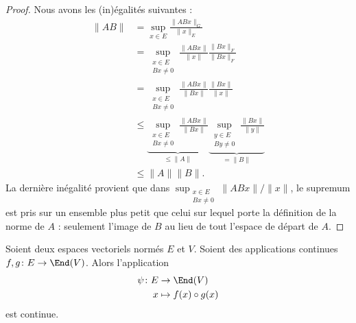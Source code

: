 \begin{proof}

    Nous avons les (in)égalités suivantes :
    \begin{subequations}
        \begin{align}
            \| AB \|&=\sup_{x\in E}\frac{ \| ABx \|_G }{ \| x \|_E }\\
            &=\sup_{\substack{x\in E\\Bx\neq 0}}\frac{ \| ABx \| }{ \| x \| }\frac{ \| Bx \|_F }{ \| Bx \|_F }\\
            &=\sup_{\substack{x\in E\\Bx\neq 0}}\frac{ \| ABx \| }{ \| Bx \| }\frac{ \| Bx \| }{ \| x \| }\\
            &\leq\underbrace{\sup_{\substack{x\in E\\Bx\neq 0}}\frac{ \| ABx \| }{ \| Bx \| }}_{\leq\| A \|}\underbrace{\sup_{\substack{y\in E\\By\neq 0}}\frac{ \| Bx \| }{ \| y \| }}_{=\| B \|}\\
            &\leq \| A \|\| B \|.
        \end{align}
    \end{subequations}
    La dernière inégalité provient que dans \( \sup_{\substack{x\in E\\Bx\neq 0}}\| ABx \|/\| x \|\), le supremum est pris sur un ensemble plus petit que celui sur lequel porte la définition de la norme de \( A\) : seulement l'image de \( B\) au lieu de tout l'espace de départ de \( A\).
\end{proof}



\begin{proposition}     \label{PROPooJGNFooEwtNmJ}
    Soient deux espaces vectoriels normés \( E\) et \( V\). Soient des applications continues \( f,g\colon E\to \End(V)\). Alors l'application
    \begin{equation}
        \begin{aligned}
            \psi\colon E&\to \End(V) \\
            x&\mapsto f(x)\circ g(x) 
        \end{aligned}
    \end{equation}
    est continue.
\end{proposition}

